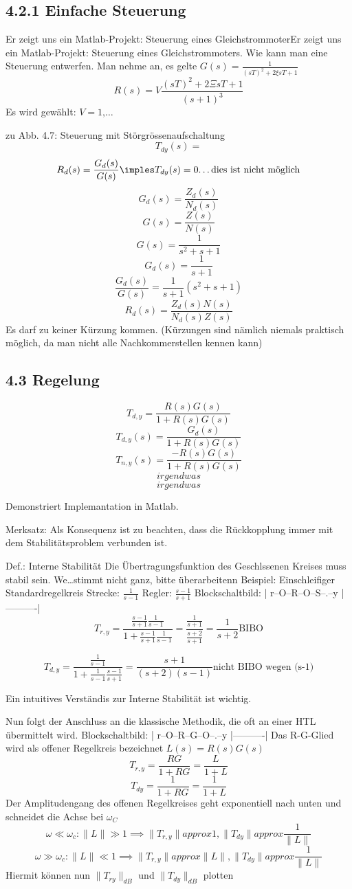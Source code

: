 \documentclass[a4paper]{article}
\begin{document}
\subsection*{4.2.1 Einfache Steuerung}
Er zeigt uns ein Matlab-Projekt: Steuerung eines GleichstrommoterEr zeigt uns ein Matlab-Projekt: Steuerung eines Gleichstrommoters.
Wie kann man eine Steuerung entwerfen.
Man nehme an, es gelte $G(s)=\frac{1}{(sT)^{2}+2\xi sT+1}$
\[ R(s)=V \frac{(sT)^{2}+2\Xi sT+1}{(s+1)^{3}} \]
Es wird gewählt: $V=1\text{,}\ldots  $

zu Abb. 4.7: Steuerung mit Störgrössenaufschaltung
\[ T_{dy}(s)=\]
\[ R_{d}(s)=\frac{G_{d}(s)}{G(s)}\imples T_{dy}(s)=0 \text{\ldots dies ist nicht möglich}\]
\[ G_{d}(s)=\frac{Z_{d}(s)}{N_{d}(s)} \]
\[ G(s)=\frac{Z(s)}{N(s)} \]
\[ G(s)=\frac{1}{s^{2}+s+1} \]
\[ G_{d}(s)=\frac{1}{s+1} \]
\[ \frac{G_{d}(s)}{G(s)}=\frac{1}{s+1}(s^{2}+s+1) \]
\[ R_{d}(s)=\frac{Z_{d}(s)N(s)}{N_{d}(s)Z(s)} \]
Es darf zu keiner Kürzung kommen. (Kürzungen sind nämlich niemals praktisch möglich, da man nicht alle Nachkommerstellen kennen kann)

\subsection*{4.3 Regelung}
\[ T_{d,y}=\frac{R(s)G(s)}{1+R(s)G(s)}\]
\[ T_{d,y}(s)=\frac{G_{d}(s)}{1+R(s)G(s)} \]
\[ T_{n,y}(s)=\frac{-R(s)G(s)}{1+R(s)G(s)} \]
\[ irgendwas \]
\[ irgendwas \]

Demonstriert Implemantation in Matlab.

Merksatz: Als Konsequenz ist zu beachten, dass die Rückkopplung immer mit dem Stabilitätsproblem verbunden ist.

Def.: Interne Stabilität
Die Übertragungsfunktion des Geschlssenen Kreises muss stabil sein. We\ldots stimmt nicht ganz, bitte überarbeitenn
Beispiel: Einschleifiger Standardregelkreis
Strecke: $\frac{1}{s-1}$
Regler: $\frac{s-1}{s+1}$
Blockschaltbild:
      |
r--O--R--O--S--.--y
  |----------|
\[ T_{r,y}=\frac{
        \frac{s-1}{s+1}
        \frac{1}{s-1}
}{
    1+ \frac{s-1}{s+1}\frac{1}{s-1}
}=\frac{
    \frac{1}{s+1}
}{
    \frac{s+2}{s+1}
}=\frac{1}{s+2}\text{BIBO}\]

\[ T_{d,y}=
\frac{
    \frac{1}{s-1}
}{
    1+
    \frac{1}{s-1}
    \frac{s-1}{s+1}
}=\frac{s+1}{(s+2)(s-1)}\text{nicht BIBO wegen (s-1)}\]

Ein intuitives Verständis zur Interne Stabilität ist wichtig.

Nun folgt der Anschluss an die klassische Methodik, die oft an einer HTL übermittelt wird.
Blockschaltbild:
         |
r--O--R--G--O--.--y
  |----------|
Das R-G-Glied wird als offener Regelkreis bezeichnet $L(s)=R(s)G(s)$
\[ T_{r,y}=\frac{RG}{1+RG}=\frac{L}{1+L} \]
\[ T_{dy}=\frac{1}{1+RG}=\frac{1}{1+L} \]
Der Amplitudengang des offenen Regelkreises geht exponentiell nach unten und schneidet die Achse bei $\omega_{C}$
 \[ \omega\ll\omega_{c}:\|L\|\gg1\implies\|T_{r,y}\|approx 1, \|T_{dy}\|approx \frac{1}{\|L\|} \]
 \[ \omega\gg\omega_{c}:\|L\|\ll1\implies\|T_{r,y}\|approx \|L\|, \|T_{dy}\|approx \frac{1}{\|L\|} \]
Hiermit können nun $\|T_{ry}\|_{dB}$ und $ \|T_{dy}\|_{dB}$ plotten
\end{document}
